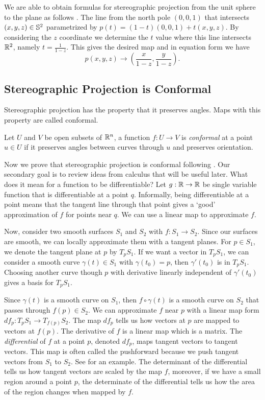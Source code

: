 We are able to obtain formulas for stereographic projection from
the unit sphere to the plane as follows \cite{christian-notes}.
The line from the north pole $(0,0,1)$ that intersects $(x,y,z)\in \mathbb{S}^2$ parametrized by 
$p(t)=(1-t)(0,0,1)+t(x,y,z)$. By considering the $z$ coordinate we determine the $t$ value where this line
intersects $\mathbb{R}^2$, namely $t=\frac{1}{1-z}.$
This gives the desired map  and in equation form we have
$$p(x,y,z)\to \left(\frac{x}{1-z},\frac{y}{1-z}\right).$$






\subsection{Stereographic Projection is Conformal}


Stereographic projection has the property that it preserves angles.
Maps with this property are called conformal. 
\begin{definition}[Conformal]\label{def:conformal}
	Let $U$ and $V$ be open subsets of $\mathbb{R}^n$, a function $f:U\to V$ is
	\emph{conformal} at a point $u\in U$ if it preserves angles between curves
	through $u$ and preserves orientation.
\end{definition}

Now we prove that stereographic projection is conformal following \cite{hilbert-imagination}.
Our secondary goal is to review ideas from calculus that will be useful later.
What does it mean for a function to be differentiable? Let $g:\mathbb{R}\rightarrow \mathbb{R}$ be single variable function that is differentiable at a point $q$. Informally, being differentiable at a point means that the tangent
line through that point gives a `good' approximation of $f$ for points near $q$. We can use a linear map to approximate $f$. 

Now, consider two smooth surfaces $S_1$ and $S_2$ with $f:S_1\rightarrow S_2.$ Since our
surfaces are smooth, we can locally approximate them with a tangent planes. 
For $p\in S_1$, we denote the tangent plane at $p$ by $T_pS_1.$ If we want a vector in $T_pS_1$,
we can consider a smooth curve $\gamma(t)\in S_1$ with $\gamma(t_0)=p$, then $\gamma'(t_0)$ 
is in $T_pS_1.$ Choosing another curve though $p$ with derivative linearly independent of $\gamma'(t_0)$
gives a basis for $T_pS_1$.


Since $\gamma(t)$ is a smooth curve on $S_1$, then $f\circ \gamma(t)$ is a smooth curve
on $S_2$ that passes through $f(p)\in S_2.$
We can approximate $f$ near $p$ with a linear map form $df_p:T_pS_1\rightarrow T_{f(p)}S_2.$
The map $df_p$ tells us how vectors at $p$ are mapped to vectors at $f(p).$
The derivative of $f$ is a linear map which is a matrix. The \emph{differential} of $f$ at a point $p$, denoted 
$df_p$, maps tangent vectors to tangent vectors. This map is often called the pushforward
because we push tangent vectors from $S_1$ to $S_2$. See  for an example.
The determinant of the differential tells us how tangent vectors are scaled by the map $f$, moreover,
if we have a small region around a point $p$, the determinate of the differential tells us how 
the area of the region changes when mapped by $f$.


